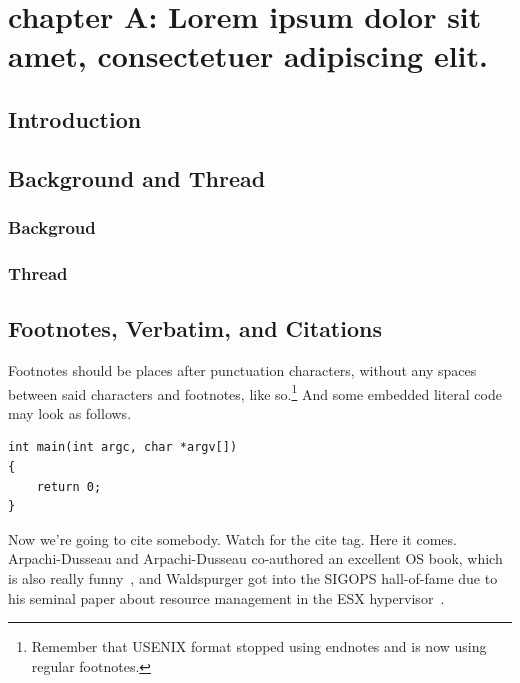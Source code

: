 \chapter{chapter A: Lorem ipsum dolor sit amet, consectetuer adipiscing elit.}
\zhlipsum[1]

\section{Introduction}
\zhlipsum[2-3]

\section{Background and Thread}
\zhlipsum[4-5]

\subsection{Backgroud}
\zhlipsum[6-7]

\subsection{Thread}
\zhlipsum[6-7]

\section{Footnotes, Verbatim, and Citations}

Footnotes should be places after punctuation characters, without any spaces between said characters and footnotes, like so.\footnote{Remember that USENIX format stopped using endnotes and is now using regular footnotes.} And some embedded literal code may look as follows.\par

\begin{verbatim}
int main(int argc, char *argv[]) 
{
    return 0;
}
\end{verbatim}

Now we're going to cite somebody. Watch for the cite tag. Here it comes. Arpachi-Dusseau and Arpachi-Dusseau co-authored an excellent OS book, which is also really funny~\cite{arpachiDusseau18:osbook}, and Waldspurger got into the SIGOPS hall-of-fame due to his seminal paper about resource management in the ESX hypervisor~\cite{waldspurger02}.\par

